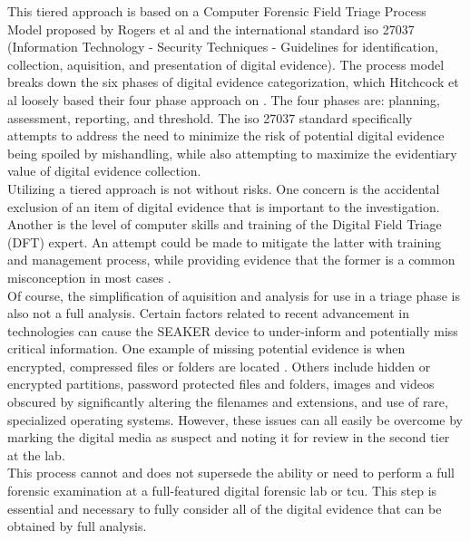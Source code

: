 \documentclass[12pt]{article}
\begin{document}
This tiered approach is based on a Computer Forensic Field Triage Process Model proposed
by Rogers et al \cite{rogers2006computer} and the international standard \gls{iso} 27037
(Information Technology - Security Techniques - Guidelines for identification, collection,
aquisition, and presentation of digital evidence). The process model breaks down the six
phases of digital evidence categorization, which Hitchcock et al
loosely based their four phase approach on \cite{hitchcock2016tiered}.  The four phases are: planning, assessment,
reporting, and threshold.  The \gls{iso} 27037 standard specifically attempts to address the need
to minimize the risk of potential digital evidence being spoiled by mishandling, while also
attempting to maximize the evidentiary value of digital evidence collection.\\

Utilizing a tiered approach is not without risks.  One concern is the accidental exclusion
of an item of digital evidence that is important to the investigation.  Another is the
level of computer skills and training of the Digital Field Triage (DFT) expert.  An attempt
could be made to mitigate the latter with training and management process, while providing
evidence that the former is a common misconception in most cases \cite{rogers2006computer}.\\

Of course, the simplification of aquisition and analysis for use in a triage phase is also
not a full analysis. Certain factors related to recent advancement in technologies can cause
the SEAKER device to under-inform and potentially miss critical information.  One
example of missing potential evidence is when encrypted, compressed files or folders
are located \cite{shaw2013practical}.  Others include hidden or encrypted partitions,
password protected files and folders, images and videos obscured by significantly altering
the filenames and extensions, and use of rare, specialized operating systems. However,
these issues can all easily be overcome by marking the digital media as suspect and noting
it for review in the second tier at the lab.\\

This process cannot and does not supersede the ability or need to perform a full forensic
examination at a full-featured digital forensic lab \cite{rogers2006computer} or \gls{tcu}.  This
step is essential and necessary to fully consider all of the digital evidence that can
be obtained by full analysis.\\
\end{document}
